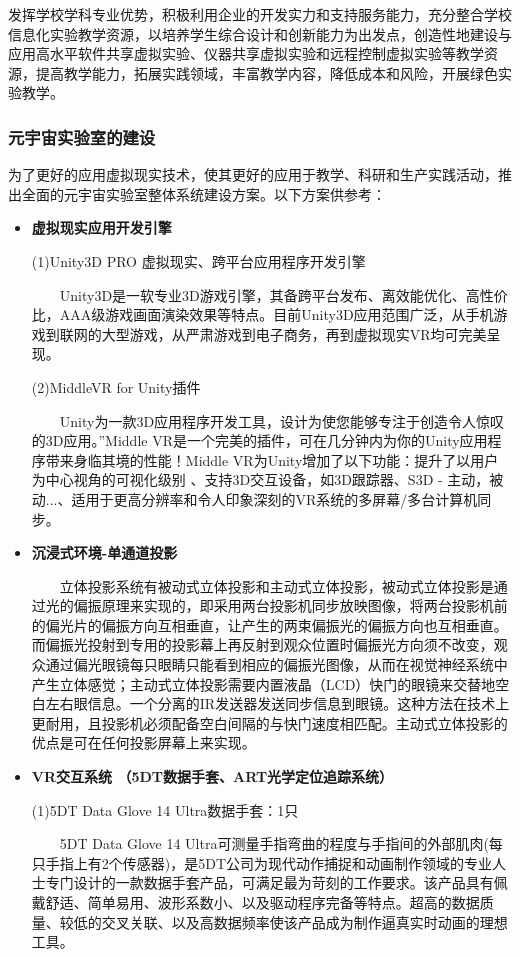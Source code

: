 \documentclass{imutthesis}
\begin{document}
发挥学校学科专业优势，积极利用企业的开发实力和支持服务能力，充分整合学校信息化实验教学资源，以培养学生综合设计和创新能力为出发点，创造性地建设与应用高水平软件共享虚拟实验、仪器共享虚拟实验和远程控制虚拟实验等教学资源，提高教学能力，拓展实践领域，丰富教学内容，降低成本和风险，开展绿色实验教学。

\subsubsection{元宇宙实验室的建设}
为了更好的应用虚拟现实技术，使其更好的应用于教学、科研和生产实践活动，推出全面的元宇宙实验室整体系统建设方案。以下方案供参考：
\begin{itemize}
    \item \textbf{虚拟现实应用开发引擎}
    
    (1)Unity3D PRO 虚拟现实、跨平台应用程序开发引擎

    $\qquad$Unity3D是一软专业3D游戏引擎，其备跨平台发布、离效能优化、高性价比，AAA级游戏画面演染效果等特点。目前Unity3D应用范围广泛，从手机游戏到联网的大型游戏，从严肃游戏到电子商务，再到虚拟现实VR均可完美呈现。

    (2)MiddleVR for Unity插件

    $\qquad$Unity为一款3D应用程序开发工具，设计为使您能够专注于创造令人惊叹的3D应用。”Middle VR是一个完美的插件，可在几分钟内为你的Unity应用程序带来身临其境的性能！Middle VR为Unity增加了以下功能：提升了以用户为中心视角的可视化级别 、支持3D交互设备，如3D跟踪器、S3D - 主动，被动...、适用于更高分辨率和令人印象深刻的VR系统的多屏幕/多台计算机同步。
    \item \textbf{沉浸式环境-单通道投影}
    
    $\qquad$立体投影系统有被动式立体投影和主动式立体投影，被动式立体投影是通过光的偏振原理来实现的，即采用两台投影机同步放映图像，将两台投影机前的偏光片的偏振方向互相垂直，让产生的两束偏振光的偏振方向也互相垂直。而偏振光投射到专用的投影幕上再反射到观众位置时偏振光方向须不改变，观众通过偏光眼镜每只眼睛只能看到相应的偏振光图像，从而在视觉神经系统中产生立体感觉；主动式立体投影需要内置液晶（LCD）快门的眼镜来交替地空白左右眼信息。一个分离的IR发送器发送同步信息到眼镜。这种方法在技术上更耐用，且投影机必须配备空白间隔的与快门速度相匹配。主动式立体投影的优点是可在任何投影屏幕上来实现。

    \item \textbf{VR交互系统 （5DT数据手套、ART光学定位追踪系统）}
    
    (1)5DT Data Glove 14 Ultra数据手套：1只

    $\qquad$5DT Data Glove 14 Ultra可测量手指弯曲的程度与手指间的外部肌肉(每只手指上有2个传感器)，是5DT公司为现代动作捕捉和动画制作领域的专业人士专门设计的一款数据手套产品，可满足最为苛刻的工作要求。该产品具有佩戴舒适、简单易用、波形系数小、以及驱动程序完备等特点。超高的数据质量、较低的交叉关联、以及高数据频率使该产品成为制作逼真实时动画的理想工具。


\end{itemize}
\end{document}
